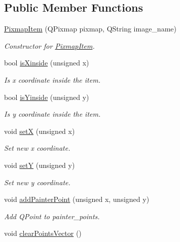 \subsection*{Public Member Functions}
\begin{DoxyCompactItemize}
\item 
\mbox{\hyperlink{classPixmapItem_a7e339e581be3c4892d2af89494bd137c}{Pixmap\+Item}} (Q\+Pixmap pixmap, Q\+String image\+\_\+name)
\begin{DoxyCompactList}\small\item\em Constructor for \mbox{\hyperlink{classPixmapItem}{Pixmap\+Item}}. \end{DoxyCompactList}\item 
bool \mbox{\hyperlink{classPixmapItem_ad5510bf5a97b352e3b06cb888ac0a99c}{is\+Xinside}} (unsigned x)
\begin{DoxyCompactList}\small\item\em Is x coordinate inside the item. \end{DoxyCompactList}\item 
bool \mbox{\hyperlink{classPixmapItem_ab6e6526fd5cd0ce5ba34b665adca6c5c}{is\+Yinside}} (unsigned y)
\begin{DoxyCompactList}\small\item\em Is y coordinate inside the item. \end{DoxyCompactList}\item 
void \mbox{\hyperlink{classPixmapItem_a692a0aca72ffbe102769fdc9246ed2f6}{setX}} (unsigned x)
\begin{DoxyCompactList}\small\item\em Set new x coordinate. \end{DoxyCompactList}\item 
void \mbox{\hyperlink{classPixmapItem_a6c6f4a872823f585edcf134d9bf209e1}{setY}} (unsigned y)
\begin{DoxyCompactList}\small\item\em Set new y coordinate. \end{DoxyCompactList}\item 
void \mbox{\hyperlink{classPixmapItem_a6e18b1223f61d40dba6e96f4da15ce5c}{add\+Painter\+Point}} (unsigned x, unsigned y)
\begin{DoxyCompactList}\small\item\em Add Q\+Point to painter\+\_\+points. \end{DoxyCompactList}\item 
void \mbox{\hyperlink{classPixmapItem_a54810877049ab858d569f83065720a18}{clear\+Points\+Vector}} ()

\end{DoxyCompactItemize}
